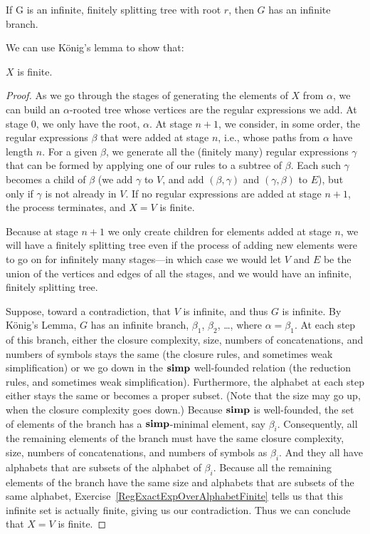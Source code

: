 \begin{lemma}
If G is an infinite, finitely splitting tree with root $r$,
then $G$ has an infinite branch.
\end{lemma}

We can use K\"onig's lemma to show that:

\begin{lemma}
$X$ is finite.
\end{lemma}

\begin{proof}
As we go through the stages of generating the elements of $X$ from
$\alpha$, we can build an $\alpha$-rooted tree whose vertices are the
regular expressions we add. At stage $0$, we only have the root,
$\alpha$.  At stage $n+1$, we consider, in some order, the regular
expressions $\beta$ that were added at stage $n$, i.e., whose paths
from $\alpha$ have length $n$. For a given $\beta$, we generate all
the (finitely many) regular expressions $\gamma$ that can be formed by
applying one of our rules to a subtree of $\beta$. Each such $\gamma$
becomes a child of $\beta$ (we add $\gamma$ to $V$, and add
$(\beta, \gamma)$ and $(\gamma, \beta)$ to $E$), but only if $\gamma$
is not already in $V$.  If no regular expressions are added at stage
$n+1$, the process terminates, and $X=V$ is finite.

Because at stage $n+1$ we only create children for elements added at
stage $n$, we will have a finitely splitting tree even if the process
of adding new elements were to go on for infinitely many stages---in
which case we would let $V$ and $E$ be the union of the vertices and
edges of all the stages, and we would have an infinite, finitely
splitting tree.

Suppose, toward a contradiction, that $V$ is infinite, and thus $G$ is
infinite. By K\"onig's Lemma, $G$ has an infinite branch, $\beta_1$,
$\beta_2$, \ldots, where $\alpha = \beta_1$. At each step of this
branch, either the closure complexity, size, numbers of
concatenations, and numbers of symbols stays the same (the closure
rules, and sometimes weak simplification) or we go down in the $\mathrel{\mathbf{simp}}$
well-founded relation (the reduction rules, and sometimes weak
simplification). Furthermore, the alphabet at each step either stays
the same or becomes a proper subset. (Note that the size may go up,
when the closure complexity goes down.) Because $\mathrel{\mathbf{simp}}$ is
well-founded, the set of elements of the branch has a $\mathrel{\mathbf{simp}}$-minimal
element, say $\beta_i$. Consequently, all the remaining elements of
the branch must have the same closure complexity, size, numbers of
concatenations, and numbers of symbols as $\beta_i$. And they all have
alphabets that are subsets of the alphabet of $\beta_i$. Because all
the remaining elements of the branch have the same size and alphabets
that are subsets of the same alphabet,
Exercise~\ref{RegExactExpOverAlphabetFinite} tells us that this
infinite set is actually finite, giving us our contradiction.  Thus we
can conclude that $X=V$ is finite.
\end{proof}

